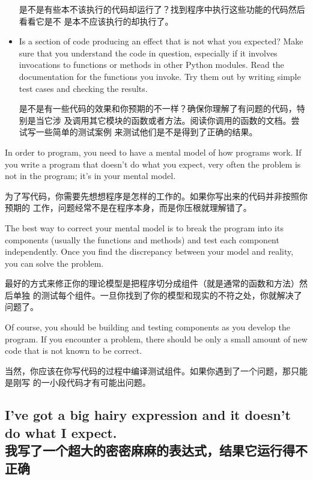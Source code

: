\documentclass[10pt]{book}
\begin{document}
\begin{CJK}{UTF8}{gbsn}
\begin{itemize}
是不是有些本不该执行的代码却运行了？找到程序中执行这些功能的代码然后看看它是不
是本不应该执行的却执行了。

\item Is a section of code producing an effect that is not
what you expected?  Make sure that you understand the code in
question, especially if it involves invocations to functions or methods in
other Python modules.  Read the documentation for the functions you invoke.
Try them out by writing simple test cases and checking the results.

是不是有一些代码的效果和你预期的不一样？确保你理解了有问题的代码，特别是当它涉
及调用其它模块的函数或者方法。阅读你调用的函数的文档。尝试写一些简单的测试案例
来测试他们是不是得到了正确的结果。

\end{itemize}

In order to program, you need to have a mental model of how
programs work.  If you write a program that doesn't do what you expect,
very often the problem is not in the program; it's in your mental
model.

为了写代码，你需要先想想程序是怎样的工作的。如果你写出来的代码并非按照你预期的
工作，问题经常不是在程序本身，而是你压根就理解错了。

The best way to correct your mental model is to break the program
into its components (usually the functions and methods) and test
each component independently.  Once you find the discrepancy
between your model and reality, you can solve the problem.

最好的方式来修正你的理论模型是把程序切分成组件（就是通常的函数和方法）然后单独
的测试每个组件。一旦你找到了你的模型和现实的不符之处，你就解决了问题了。

Of course, you should be building and testing components as you
develop the program.  If you encounter a problem,
there should be only a small amount of new code
that is not known to be correct.

当然，你应该在你写代码的过程中编译测试组件。如果你遇到了一个问题，那只能是刚写
的一小段代码才有可能出问题。

\subsection{I've got a big hairy expression and it doesn't
do what I expect.
\\我写了一个超大的密密麻麻的表达式，结果它运行得不正确}


\end{CJK}
\end{document}
